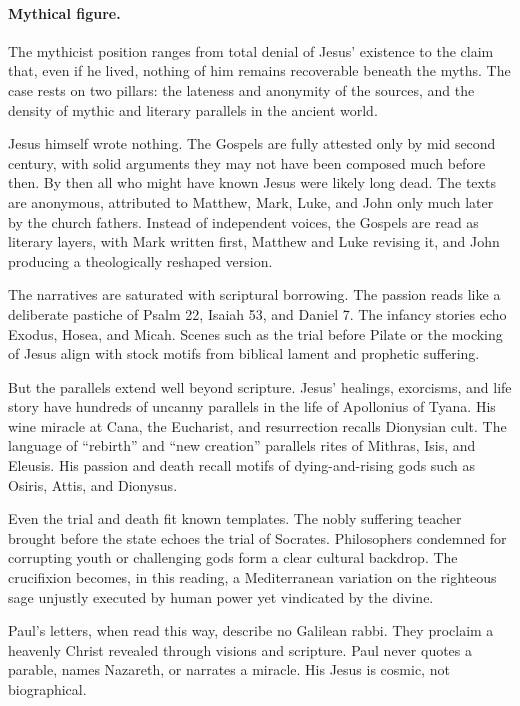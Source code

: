\paragraph{Mythical figure.}

The mythicist position ranges from total denial of Jesus’ existence to the claim that, even if he lived, nothing of him remains recoverable beneath the myths.
The case rests on two pillars: the lateness and anonymity of the sources, and the density of mythic and literary parallels in the ancient world.

Jesus himself wrote nothing.
The Gospels are fully attested only by mid second century, with solid arguments they may not have been composed much before then.
By then all who might have known Jesus were likely long dead.
The texts are anonymous, attributed to Matthew, Mark, Luke, and John only much later by the church fathers.
Instead of independent voices, the Gospels are read as literary layers, with Mark written first, Matthew and Luke revising it, and John producing a theologically reshaped version.

The narratives are saturated with scriptural borrowing.
The passion reads like a deliberate pastiche of Psalm 22, Isaiah 53, and Daniel 7.
The infancy stories echo Exodus, Hosea, and Micah.
Scenes such as the trial before Pilate or the mocking of Jesus align with stock motifs from biblical lament and prophetic suffering.

But the parallels extend well beyond scripture.
Jesus’ healings, exorcisms, and life story have hundreds of uncanny parallels in the life of Apollonius of Tyana.
His wine miracle at Cana, the Eucharist, and resurrection recalls Dionysian cult.
The language of “rebirth” and “new creation” parallels rites of Mithras, Isis, and Eleusis.
His passion and death recall motifs of dying-and-rising gods such as Osiris, Attis, and Dionysus.

Even the trial and death fit known templates.
The nobly suffering teacher brought before the state echoes the trial of Socrates.
Philosophers condemned for corrupting youth or challenging gods form a clear cultural backdrop.
The crucifixion becomes, in this reading, a Mediterranean variation on the righteous sage unjustly executed by human power yet vindicated by the divine.

Paul’s letters, when read this way, describe no Galilean rabbi.
They proclaim a heavenly Christ revealed through visions and scripture.
Paul never quotes a parable, names Nazareth, or narrates a miracle.
His Jesus is cosmic, not biographical.

